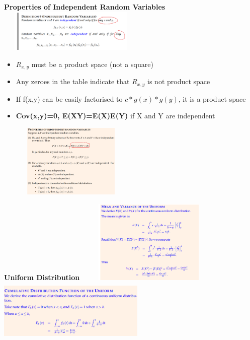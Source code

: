 \documentclass[10pt, landscape]{article}
\begin{document}
\begin{multicols}{4}
\textbf{Properties of Independent Random Variables} \newline
\includegraphics[width=7cm, height=2cm]{indepdent_random_var.png}
\begin{itemize}
  \item $R_{x,y}$ must be a product space (not a square)
  \item Any zeroes in the table indicate that $R_{x,y}$ is not product space
  \item If f(x,y) can be easily factorised to $c*g(x)*g(y)$, it is a product space
  \item \textbf{Cov(x,y)=0, E(XY)=E(X)E(Y)} if X and Y are independent
\end{itemize}
\includegraphics[width=7cm, height=3.5cm]{properties_independent_random.png}


\textbf{Uniform Distribution} \newline
\includegraphics[width=7cm, height=4cm]{uniform1.png}
\includegraphics[width=7cm, height=3cm]{uniform2.png}


\end{multicols}
\end{document}
